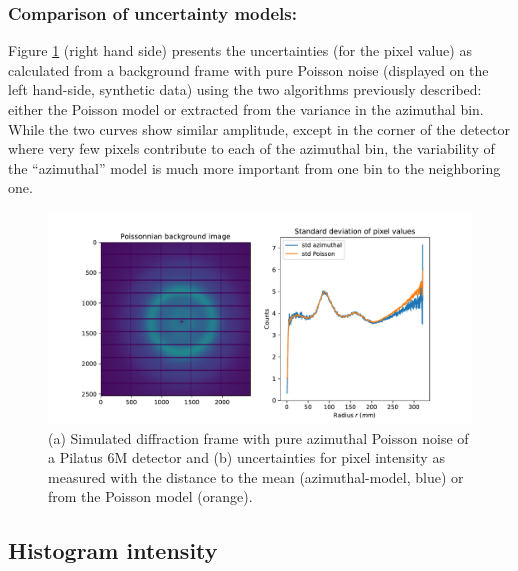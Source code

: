 \documentclass[preprint]{iucr}              %
\begin{document}
\subsubsection{Comparison of uncertainty models:}
Figure \ref{fig_std} (right hand side) presents the uncertainties (for the pixel value) as calculated from a background frame with pure Poisson noise (displayed on the left hand-side, synthetic data) using the two algorithms previously described: either the Poisson model or extracted from the variance in the azimuthal bin. 
While the two curves show similar amplitude, except in the corner of the detector where very few pixels contribute to each of the azimuthal bin, the variability of the ``azimuthal'' model is much more important from one bin to the neighboring one.
\begin{figure}
\label{fig_std}
\begin{center}
\includegraphics[width=14cm]{fig_std}
\caption{(a) Simulated diffraction frame with pure azimuthal Poisson noise of a Pilatus 6M detector and (b) uncertainties for pixel intensity as measured with the distance to the mean (azimuthal-model, blue) or from the Poisson model (orange).}
\end{center}
\end{figure}

\subsection{Histogram intensity }
\end{document}
